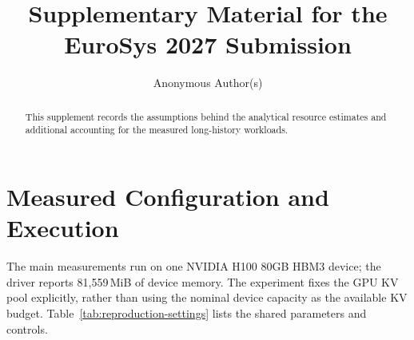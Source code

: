 \documentclass[sigplan,10pt,anonymous,review]{acmart}
\begin{document}
\title{Supplementary Material for the EuroSys 2027 Submission}
\author{Anonymous Author(s)}

\begin{abstract}
This supplement records the assumptions behind the analytical resource estimates and additional accounting for the measured long-history workloads.
\end{abstract}

\maketitle

\section{Measured Configuration and Execution}

The main measurements run on one NVIDIA H100 80GB HBM3 device; the driver reports 81,559\,MiB of device memory.
The experiment fixes the GPU KV pool explicitly, rather than using the nominal device capacity as the available KV budget.
Table~\ref{tab:reproduction-settings} lists the shared parameters and controls.
\end{document}

